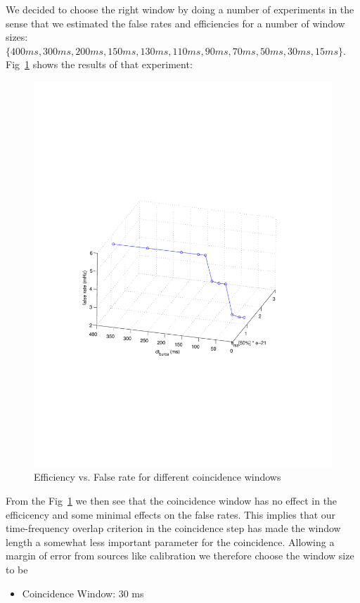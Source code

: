 We decided to choose the right window by doing a number of experiments
in the sense that we estimated the false rates and efficiencies
for a number of window sizes: $\{400 ms, 300ms, 200ms, 150 ms, 130ms,
110ms, 90ms, 70ms, 50ms, 30ms, 15ms\} $.  Fig~\ref{fig:tuneburcawindow}
shows the results of that experiment:   
\begin{figure}[h]
\begin{center}
\includegraphics[width=1.0\textwidth]{figures/tune_burca_window}
\caption{Efficiency vs. False rate for different coincidence windows}
\label{fig:tuneburcawindow}
\end{center}
\end{figure} 
From the Fig~\ref{fig:tuneburcawindow} we then see that the coincidence
window has no effect in the efficicency and some minimal effects on
the false rates. This implies that our time-frequency overlap criterion
in the coincidence step has made the window length a somewhat less 
important parameter for the coincidence. Allowing a margin of error 
from sources like calibration we therefore choose the window size to be
\begin{itemize}
\item Coincidence Window: 30 ms
\end{itemize}


